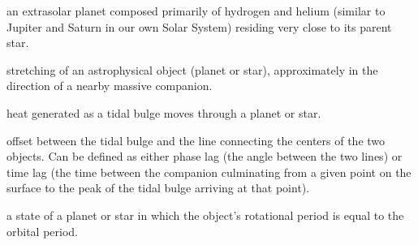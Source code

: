 \begin{glossary}[Glossary]

     an extrasolar planet composed primarily of hydrogen and
    helium (similar to Jupiter and Saturn in our own Solar System) residing very
    close to its parent star.

     stretching of an astrophysical object (planet or star),
    approximately in the direction of a nearby massive companion.

     heat generated as a tidal bulge moves through a
    planet or star.

     offset between the tidal bulge and the line connecting the
    centers of the two objects. Can be defined as either phase lag (the angle
    between the two lines) or time lag (the time between the companion
        culminating from a given point on the surface to the peak of the tidal
    bulge arriving at that point).

     a state of a planet or star in which the
    object's rotational period is equal to the orbital period.

\end{glossary}
